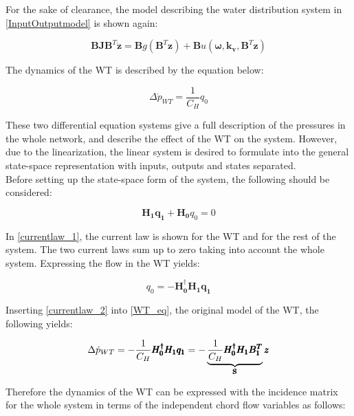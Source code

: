 For the sake of clearance, the model describing the water distribution system in \eqref{InputOutputmodel} is shown again:  

\begin{equation}
 \pmb{B}\pmb{J {B}}^T \pmb{\dot{z}} = \pmb{B} g(\pmb{B}^T \pmb{z})+ \pmb{B} u(\pmb{\omega},\pmb{k_v	}, \pmb{B}^T \pmb{z})
 \label{InputOutputmodel}
\end{equation}

The dynamics of the WT is described by the equation below: 

\begin{equation}
\Delta \dot{p}_{WT} = \frac{1}{C_H} q_0
 \label{WT_eq}
\end{equation}

These two differential equation systems give a full description of the pressures in the whole network, and  describe the effect of the WT on the system. However, due to the linearization, the linear system is desired to formulate into the general state-space representation with inputs, outputs and states separated. 
\\
Before setting up the state-space form of the system, the following should be considered: 

\begin{equation}
 \pmb{H_1}\pmb{q_1} + \pmb{H_0}q_0 = 0 
 \label{currentlaw_1}
\end{equation}

In \eqref{currentlaw_1}, the current law is shown for the WT and for the rest of the system. The two current laws sum up to zero taking into account the whole system. Expressing the flow in the WT yields:

\begin{equation}
q_0 = -\pmb{H^{\dagger}_0}\pmb{H_1}\pmb{q_1}
 \label{currentlaw_2}
\end{equation}

Inserting \eqref{currentlaw_2} into \eqref{WT_eq}, the original model of the WT, the following yields:


\begin{equation}
\Delta \dot{p}_{WT} = - \frac{1}{C_H} \pmb{H^{\dagger}_0}\pmb{H_1}\pmb{q_1} = - \underbrace{\frac{1}{C_H} \pmb{H^{\dagger}_0}\pmb{H_1}\pmb{{B_1^{T}}}}_\text{\pmb{S}} \pmb{z}
 \label{currentlaw_3}
\end{equation}

Therefore the dynamics of the WT can be expressed with the incidence matrix for the whole system in terms of the independent chord flow variables as follows: 

